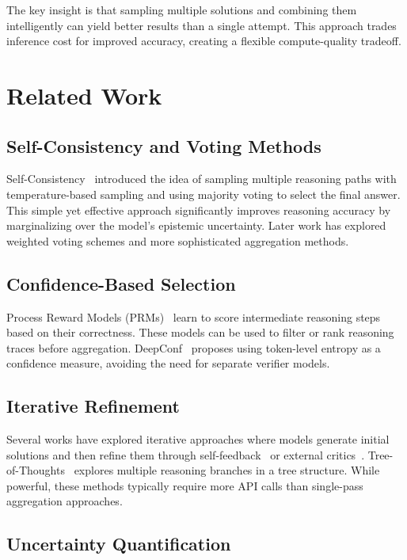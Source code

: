 \documentclass[11pt]{article}
\begin{document}
The key insight is that sampling multiple solutions and combining them intelligently can yield better results than a single attempt. This approach trades inference cost for improved accuracy, creating a flexible compute-quality tradeoff.

\section{Related Work}

\subsection{Self-Consistency and Voting Methods}

Self-Consistency~\cite{wang2022self} introduced the idea of sampling multiple reasoning paths with temperature-based sampling and using majority voting to select the final answer. This simple yet effective approach significantly improves reasoning accuracy by marginalizing over the model's epistemic uncertainty. Later work has explored weighted voting schemes and more sophisticated aggregation methods.

\subsection{Confidence-Based Selection}

Process Reward Models (PRMs)~\cite{cobbe2021training,lightman2023lets} learn to score intermediate reasoning steps based on their correctness. These models can be used to filter or rank reasoning traces before aggregation. DeepConf~\cite{sun2024deep} proposes using token-level entropy as a confidence measure, avoiding the need for separate verifier models.

\subsection{Iterative Refinement}

Several works have explored iterative approaches where models generate initial solutions and then refine them through self-feedback~\cite{madaan2024self} or external critics~\cite{gou2024critic}. Tree-of-Thoughts~\cite{yao2024tree} explores multiple reasoning branches in a tree structure. While powerful, these methods typically require more API calls than single-pass aggregation approaches.

\subsection{Uncertainty Quantification}
\end{document}
